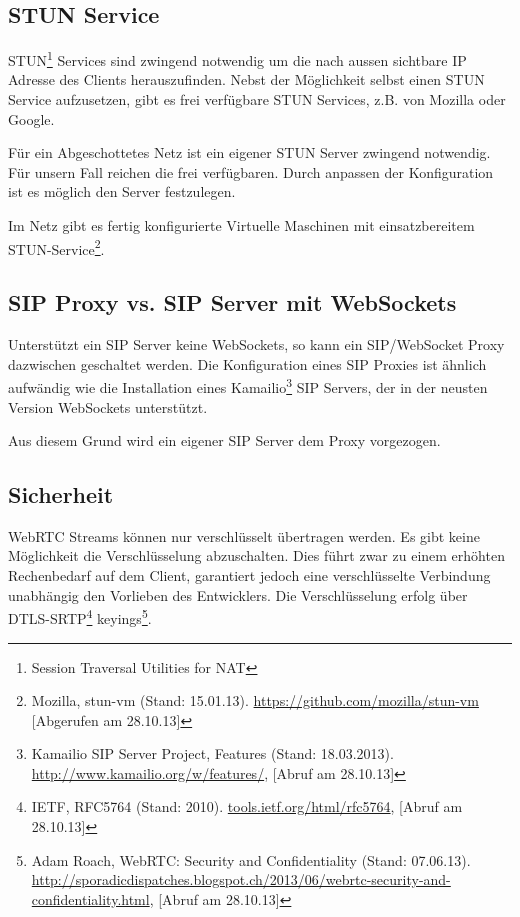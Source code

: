 	\subsection{STUN Service}
		STUN\footnote{Session Traversal Utilities for NAT} Services sind zwingend notwendig um die nach aussen sichtbare IP Adresse des Clients herauszufinden. Nebst der Möglichkeit selbst einen STUN Service aufzusetzen, gibt es frei verfügbare STUN Services, z.B. von Mozilla oder Google.

		Für ein Abgeschottetes Netz ist ein eigener STUN Server zwingend notwendig. Für unsern Fall reichen die frei verfügbaren. Durch anpassen der Konfiguration ist es möglich den Server festzulegen.

		Im Netz gibt es fertig konfigurierte Virtuelle Maschinen mit einsatzbereitem STUN-Service\footnote{Mozilla, stun-vm (Stand: 15.01.13). \hyperlink{https://github.com/mozilla/stun-vm}{https://github.com/mozilla/stun-vm} [Abgerufen am 28.10.13]}.

	\subsection{SIP Proxy vs. SIP Server mit WebSockets}
		Unterstützt ein SIP Server keine WebSockets, so kann ein SIP/WebSocket Proxy dazwischen geschaltet werden. Die Konfiguration eines SIP Proxies ist ähnlich aufwändig wie die Installation eines Kamailio\footnote{Kamailio SIP Server Project, Features (Stand: 18.03.2013). \hyperlink{http://www.kamailio.org/w/features/}{http://www.kamailio.org/w/features/}, [Abruf am 28.10.13]} SIP Servers, der in der neusten Version WebSockets unterstützt.

		Aus diesem Grund wird ein eigener SIP Server dem Proxy vorgezogen.

	\subsection{Sicherheit}
		WebRTC Streams können nur verschlüsselt übertragen werden. Es gibt keine Möglichkeit die Verschlüsselung abzuschalten. Dies führt zwar zu einem erhöhten Rechenbedarf auf dem Client, garantiert jedoch eine verschlüsselte Verbindung unabhängig den Vorlieben des Entwicklers.
		Die Verschlüsselung erfolg über DTLS-SRTP\footnote{IETF, RFC5764 (Stand: 2010). \hyperlink{http://tools.ietf.org/html/rfc5764}{tools.ietf.org/html/rfc5764}, [Abruf am 28.10.13]} keyings\footnote{Adam Roach, WebRTC: Security and Confidentiality (Stand: 07.06.13). \hyperlink{http://sporadicdispatches.blogspot.ch/2013/06/webrtc-security-and-confidentiality.html}{http://sporadicdispatches.blogspot.ch/2013/06/webrtc-security-and-confidentiality.html}, [Abruf am 28.10.13]}. 
		
